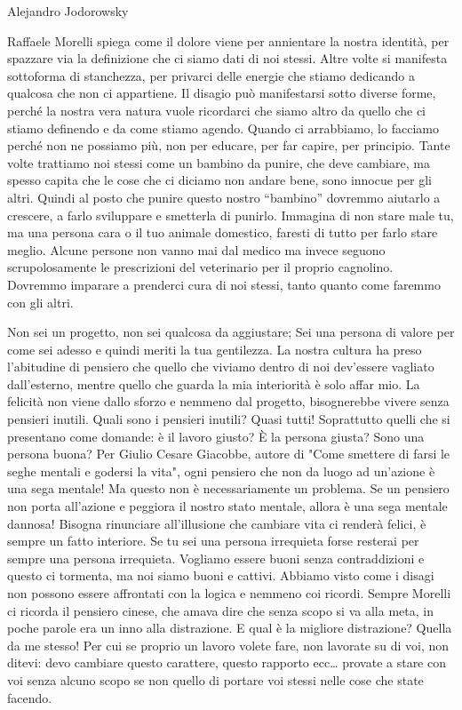 \documentclass[12pt]{book} %
\begin{document}
Alejandro Jodorowsky

Raffaele Morelli spiega come il dolore viene per annientare la nostra identità, per spazzare via la definizione che ci
siamo dati di noi stessi. Altre volte si manifesta sottoforma di stanchezza, per privarci delle energie che stiamo
dedicando a qualcosa che non ci appartiene. Il disagio può manifestarsi sotto diverse forme, perché la nostra vera
natura vuole ricordarci che siamo altro da quello che ci stiamo definendo e da come stiamo agendo. Quando ci
arrabbiamo, lo facciamo perché non ne possiamo più, non per educare, per far capire, per principio. Tante volte
trattiamo noi stessi come un bambino da punire, che deve cambiare, ma spesso capita che le cose che ci diciamo non
andare bene, sono innocue per gli altri. Quindi al posto che punire questo nostro “bambino” dovremmo aiutarlo a
crescere, a farlo sviluppare e smetterla di punirlo. 
Immagina di non stare male tu, ma una
persona cara o il tuo animale domestico, faresti di tutto per farlo stare meglio. Alcune persone non vanno mai dal
medico ma invece seguono scrupolosamente le prescrizioni del veterinario per il proprio cagnolino. Dovremmo imparare a
prenderci cura di noi stessi, tanto quanto come faremmo con gli altri.

Non sei un progetto, non sei qualcosa da aggiustare; Sei una
persona di valore per come sei adesso e quindi meriti la tua gentilezza. La nostra cultura ha preso l'abitudine di
pensiero che quello che viviamo dentro di noi dev'essere vagliato dall'esterno, mentre quello che
guarda la mia interiorità è solo affar mio. La felicità non viene dallo sforzo e nemmeno dal
progetto, bisognerebbe vivere senza pensieri inutili. Quali sono i pensieri inutili? Quasi tutti! Soprattutto quelli
che si presentano come domande: è il lavoro giusto? È la persona giusta? Sono una persona
buona? 
Per Giulio Cesare Giacobbe, autore di "Come smettere di farsi le seghe mentali e godersi la vita", ogni pensiero che non da luogo ad un'azione è una sega mentale! Ma questo non è necessariamente un problema. Se un pensiero non porta all'azione e peggiora il nostro stato mentale, allora è una sega mentale dannosa!
Bisogna rinunciare all'illusione che cambiare vita ci
renderà felici, è sempre un fatto interiore. Se tu sei una persona irrequieta forse resterai per sempre una persona irrequieta. Vogliamo
essere buoni senza contraddizioni e questo ci tormenta, ma noi siamo buoni e cattivi. Abbiamo visto come i disagi non
possono essere affrontati con la logica e nemmeno coi ricordi. 
Sempre Morelli ci ricorda il pensiero cinese, che amava dire che senza scopo si va alla meta, in poche parole era un inno alla distrazione. E qual è la migliore distrazione? Quella da me stesso! Per cui se proprio un lavoro volete fare, non lavorate su di voi, non ditevi: devo cambiare questo carattere, questo rapporto ecc… provate a stare con voi senza alcuno scopo se non quello di portare voi stessi nelle cose che state facendo. 
\end{document}
